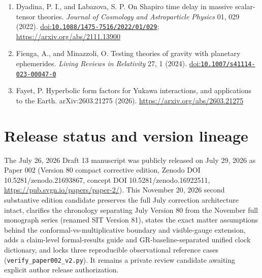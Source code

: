 \documentclass[
  american,
  11pt,
  letterpaper,
]{article}
\begin{document}
\begin{enumerate}
\item
  Dyadina, P. I., and Labazova, S. P. On Shapiro time delay in massive scalar-tensor theories. \emph{Journal of Cosmology and Astroparticle Physics} 01, 029 (2022). \href{https://doi.org/10.1088/1475-7516/2022/01/029}{doi:\nolinkurl{10.1088/1475-7516/2022/01/029}}; \url{https://arxiv.org/abs/2111.13900}
\item
  Fienga, A., and Minazzoli, O. Testing theories of gravity with planetary ephemerides. \emph{Living Reviews in Relativity} 27, 1 (2024). \href{https://doi.org/10.1007/s41114-023-00047-0}{doi:\nolinkurl{10.1007/s41114-023-00047-0}}
\item
  Fayet, P. Hyperbolic form factors for Yukawa interactions, and applications to the Earth. arXiv:2603.21275 (2026). \url{https://arxiv.org/abs/2603.21275}
\end{enumerate}

\section{Release status and version lineage}\label{release-status-and-version-lineage}

The July 26, 2026 Draft 13 manuscript was publicly released on July 29, 2026 as Paper 002 (Version 80 compact corrective edition, Zenodo DOI 10.5281/zenodo.21693867, concept DOI 10.5281/zenodo.16922511, \url{https://pub.svgn.io/papers/paper-2/}). This November 20, 2026 second substantive edition candidate preserves the full July correction architecture intact, clarifies the chronology separating July Version 80 from the November full monograph series (renamed SIT Version 81), states the exact matter assumptions behind the conformal-vs-multiplicative boundary and visible-gauge extension, adds a claim-level formal-results guide and GR-baseline-separated unified clock dictionary, and locks three reproducible observational reference cases (\nolinkurl{verify_paper002_v2.py}). It remains a private review candidate awaiting explicit author release authorization.
\end{document}
